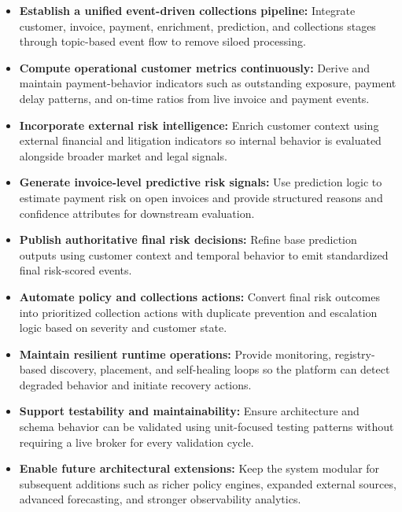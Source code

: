 \documentclass[a4paper, 12pt]{report}
\begin{document}
\begin{itemize}[itemsep=2pt]
    \item \textbf{Establish a unified event-driven collections pipeline:}
    Integrate customer, invoice, payment, enrichment, prediction, and collections stages through topic-based event flow to remove siloed processing.
    
    \item \textbf{Compute operational customer metrics continuously:}
    Derive and maintain payment-behavior indicators such as outstanding exposure, payment delay patterns, and on-time ratios from live invoice and payment events.
    
    \item \textbf{Incorporate external risk intelligence:}
    Enrich customer context using external financial and litigation indicators so internal behavior is evaluated alongside broader market and legal signals.
    
    \item \textbf{Generate invoice-level predictive risk signals:}
    Use prediction logic to estimate payment risk on open invoices and provide structured reasons and confidence attributes for downstream evaluation.
    
    \item \textbf{Publish authoritative final risk decisions:}
    Refine base prediction outputs using customer context and temporal behavior to emit standardized final risk-scored events.
    
    \item \textbf{Automate policy and collections actions:}
    Convert final risk outcomes into prioritized collection actions with duplicate prevention and escalation logic based on severity and customer state.
    
    \item \textbf{Maintain resilient runtime operations:}
    Provide monitoring, registry-based discovery, placement, and self-healing loops so the platform can detect degraded behavior and initiate recovery actions.
    
    \item \textbf{Support testability and maintainability:}
    Ensure architecture and schema behavior can be validated using unit-focused testing patterns without requiring a live broker for every validation cycle.
    
    \item \textbf{Enable future architectural extensions:}
    Keep the system modular for subsequent additions such as richer policy engines, expanded external sources, advanced forecasting, and stronger observability analytics.
\end{itemize}
\end{document}
